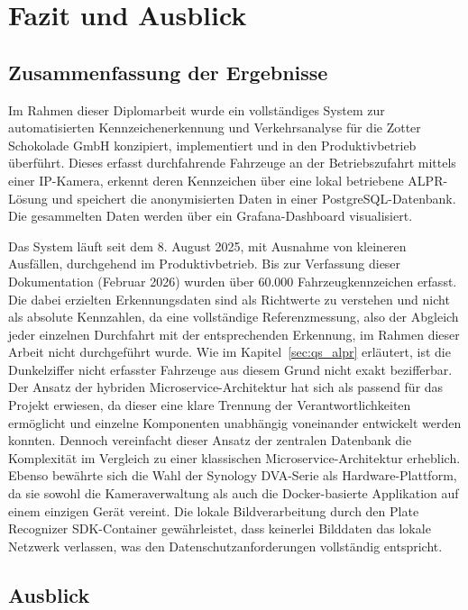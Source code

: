 \section{Fazit und Ausblick}
\label{sec:fazit}

\subsection{Zusammenfassung der Ergebnisse}

Im Rahmen dieser Diplomarbeit wurde ein vollständiges System zur automatisierten Kennzeichenerkennung und Verkehrsanalyse für die Zotter Schokolade GmbH konzipiert, implementiert und in den Produktivbetrieb überführt.
Dieses erfasst durchfahrende Fahrzeuge an der Betriebszufahrt mittels einer IP-Kamera, erkennt deren Kennzeichen über eine lokal betriebene ALPR-Lösung und speichert die anonymisierten Daten in einer PostgreSQL-Datenbank.
Die gesammelten Daten werden über ein Grafana-Dashboard visualisiert.

Das System läuft seit dem 8. August 2025, mit Ausnahme von kleineren Ausfällen, durchgehend im Produktivbetrieb.
Bis zur Verfassung dieser Dokumentation (Februar 2026) wurden über 60.000 Fahrzeugkennzeichen erfasst.
Die dabei erzielten Erkennungsdaten sind als Richtwerte zu verstehen und nicht als absolute Kennzahlen, da eine vollständige Referenzmessung, also der Abgleich jeder einzelnen Durchfahrt mit der entsprechenden Erkennung, im Rahmen dieser Arbeit nicht durchgeführt wurde.
Wie im Kapitel~\ref{sec:qs_alpr} erläutert, ist die Dunkelziffer nicht erfasster Fahrzeuge aus diesem Grund nicht exakt bezifferbar. \\

Der Ansatz der hybriden Microservice-Architektur hat sich als passend für das Projekt erwiesen, da dieser eine klare Trennung der Verantwortlichkeiten ermöglicht und einzelne Komponenten unabhängig voneinander entwickelt werden konnten.
Dennoch vereinfacht dieser Ansatz der zentralen Datenbank die Komplexität im Vergleich zu einer klassischen Microservice-Architektur erheblich.
Ebenso bewährte sich die Wahl der Synology DVA-Serie als Hardware-Plattform, da sie sowohl die Kameraverwaltung als auch die Docker-basierte Applikation auf einem einzigen Gerät vereint.
Die lokale Bildverarbeitung durch den Plate Recognizer SDK-Container gewährleistet, dass keinerlei Bilddaten das lokale Netzwerk verlassen, was den Datenschutzanforderungen vollständig entspricht.

\newpage
\subsection{Ausblick}

